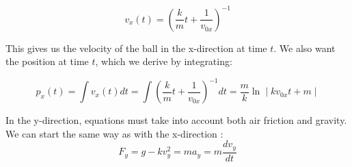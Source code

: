 \documentclass{article}
\begin{document}
\begin{equation}
v_x(t) = (\frac{k}{m}t+\frac{1}{v_{0x}})^{-1}
\end{equation}

\noindent This gives us the velocity of the ball in the x-direction at time $t$. We also want the position at time $t$, which we derive by integrating:

\begin{equation}
p_x(t) = \int v_x(t)dt = \int(\frac{k}{m}t+\frac{1}{v_{0x}})^{-1} dt = \frac{m}{k} \ln \mid kv_{0x}t+m \mid
\end{equation}

\noindent In the y-direction, equations must take into account both air friction and gravity. We can start the same way as with the x-direction \cite{greenwade93}:
\begin{equation}
F_y = g-kv_y^2 = ma_y = m \frac{dv_y}{dt}
\end{equation}


\end{document}
